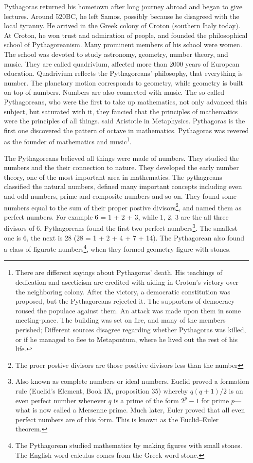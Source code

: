 \documentclass[b5paper]{article}
\begin{document}
Pythagoras returned his hometown after long journey abroad and began to give lectures. Around 520BC, he left Samos, possibly because he disagreed with the local tyranny. He arrived in the Greek colony of Croton (southern Italy today). At Croton, he won trust and admiration of people, and founded the philosophical school of Pythagoreanism. Many prominent members of his school were women. The school was devoted to study astronomy, geometry, number theory, and music. They are called quadrivium, affected more than 2000 years of European education\cite{StepanovRose15}. Quadrivium reflects the Pythagoreans' philosophy, that everything is number. The planetary motion corresponds to geometry, while geometry is built on top of numbers. Numbers are also connected with music. The so-called Pythagoreans, who were the first to take up mathematics, not only advanced this subject, but saturated with it, they fancied that the principles of mathematics were the principles of all things. said Aristotle in Metaphysics. Pythagoras is the first one discovered the pattern of octave in mathematics. Pythagoras was revered as the founder of mathematics and music\footnote{There are different sayings about Pythagoras' death. His teachings of dedication and asceticism are credited with aiding in Croton's victory over the neighboring colony. After the victory, a democratic constitution was proposed, but the Pythagoreans rejected it. The supporters of democracy roused the populace against them. An attack was made upon them in some meeting-place. The building was set on fire, and many of the members perished; Different sources disagree regarding whether Pythagoras was killed, or if he managed to flee to Metapontum, where he lived out the rest of his life.}.

The Pythagoreans believed all things were made of numbers. They studied the numbers and the their connection to nature. They developed the early number theory, one of the most important area in mathematics. The pythagreans classified the natural numbers, defined many important concepts including even and odd numbers, prime and composite numbers and so on. They found some numbers equal to the sum of their proper postive divisors\footnote{The proer postive divisors are those positive divisors less than the number}, and named them as perfect numbers. For example 6 = 1 + 2 + 3, while 1, 2, 3 are the all three divisors of 6. Pythagoreans found the first two perfect numbers\footnote{Also known as complete numbers or ideal numbers. Euclid proved a formation rule (Euclid's Element, Book IX, proposition 35) whereby $q(q+1)/2$ is an even perfect number whenever $q$ is a prime of the form $2^p-1$ for prime $p$—what is now called a Mersenne prime. Much later, Euler proved that all even perfect numbers are of this form. This is known as the Euclid–Euler theorem.}. The smallest one is 6, the next is 28 (28 = 1 + 2 + 4 + 7 + 14). The Pythagorean also found a class of figurate numbers\footnote{The Pythagorean studied mathematics by making figures with small stones. The English word calculus comes from the Greek word stone\cite{HanXueTao16}.}, when they formed geometry figure with stones.
\end{document}
